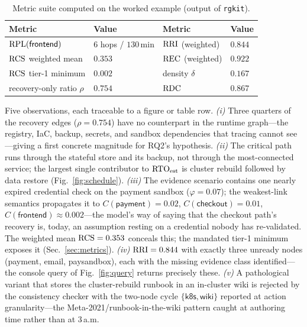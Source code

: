 \begin{table}[t]
\centering\small
\caption{Metric suite computed on the worked example (output of \texttt{rgkit}).}
\label{tab:examplemetrics}
\begin{tabular}{@{}llll@{}}
\toprule
\textbf{Metric} & \textbf{Value} & \textbf{Metric} & \textbf{Value} \\
\midrule
$\mathrm{RPL}(\textsf{frontend})$ & $6$ hops / $130$\,min & $\mathrm{RRI}$ (weighted) & $0.844$ \\
$\mathrm{RCS}$ weighted mean & $0.353$ & $\mathrm{REC}$ (weighted) & $0.922$ \\
$\mathrm{RCS}$ tier-1 minimum & $0.002$ & density $\delta$ & $0.167$ \\
recovery-only ratio $\rho$ & $0.754$ & $\mathrm{RDC}$ & $0.867$ \\
\bottomrule
\end{tabular}
\end{table}

Five observations, each traceable to a figure or table row. \emph{(i)} Three quarters of the recovery edges ($\rho = 0.754$) have no counterpart in the runtime graph---the registry, IaC, backup, secrets, and sandbox dependencies that tracing cannot see---giving a first concrete magnitude for RQ2's hypothesis. \emph{(ii)} The critical path runs through the stateful store and its backup, not through the most-connected service; the largest single contributor to $\mathrm{RTO}_{\mathrm{est}}$ is cluster rebuild followed by data restore (Fig.~\ref{fig:schedule}). \emph{(iii)} The evidence scenario contains one nearly expired credential check on the payment sandbox ($\varphi = 0.07$); the weakest-link semantics propagates it to $C(\textsf{payment}) = 0.02$, $C(\textsf{checkout}) = 0.01$, $C(\textsf{frontend}) \approx 0.002$---the model's way of saying that the checkout path's recovery is, today, an assumption resting on a credential nobody has re-validated. The weighted mean $\mathrm{RCS} = 0.353$ conceals this; the mandated tier-1 minimum exposes it (Sec.~\ref{sec:metrics}). \emph{(iv)} $\mathrm{RRI} = 0.844$ with exactly three unready nodes (\textsf{payment}, \textsf{email}, \textsf{paysandbox}), each with the missing evidence class identified---the console query of Fig.~\ref{fig:query} returns precisely these. \emph{(v)} A pathological variant that stores the cluster-rebuild runbook in an in-cluster wiki is rejected by the consistency checker with the two-node cycle $\{\textsf{k8s}, \textsf{wiki}\}$ reported at action granularity---the Meta-2021/runbook-in-the-wiki pattern caught at authoring time rather than at 3\,a.m.

